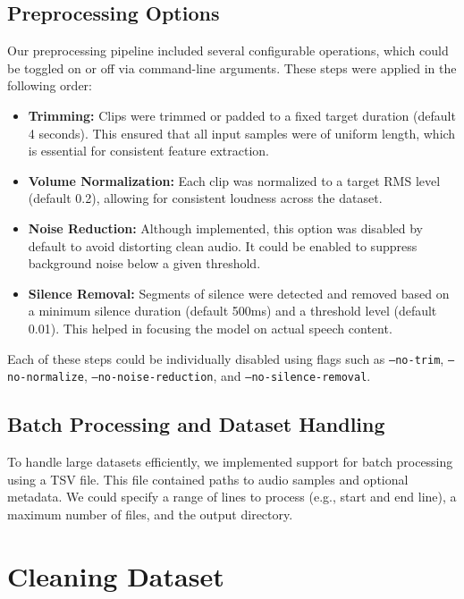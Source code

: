 \documentclass[a4paper,12pt]{article}
\begin{document}
\subsection{Preprocessing Options}

Our preprocessing pipeline included several configurable operations, which could be toggled on or off via command-line arguments. These steps were applied in the following order:

\begin{itemize}
    \item \textbf{Trimming:} Clips were trimmed or padded to a fixed target duration (default 4 seconds). This ensured that all input samples were of uniform length, which is essential for consistent feature extraction.
    
    \item \textbf{Volume Normalization:} Each clip was normalized to a target RMS level (default 0.2), allowing for consistent loudness across the dataset.
    
    \item \textbf{Noise Reduction:} Although implemented, this option was disabled by default to avoid distorting clean audio. It could be enabled to suppress background noise below a given threshold.
    
    \item \textbf{Silence Removal:} Segments of silence were detected and removed based on a minimum silence duration (default 500ms) and a threshold level (default 0.01). This helped in focusing the model on actual speech content.
\end{itemize}

Each of these steps could be individually disabled using flags such as \texttt{--no-trim}, \texttt{--no-normalize}, \texttt{--no-noise-reduction}, and \texttt{--no-silence-removal}.

\subsection{Batch Processing and Dataset Handling}

To handle large datasets efficiently, we implemented support for batch processing using a TSV file. This file contained paths to audio samples and optional metadata. We could specify a range of lines to process (e.g., start and end line), a maximum number of files, and the output directory.

\newpage
\section{Cleaning Dataset}
\end{document}
